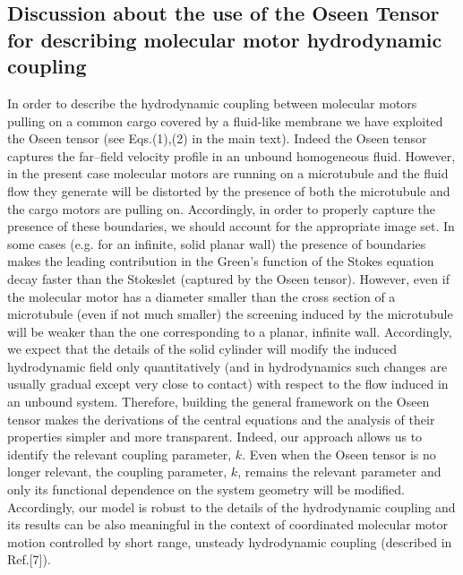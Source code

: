 \documentclass[prl,aps,twocolumn, floatfix, superscriptaddress,showpacs]{revtex4}
\begin{document}

\newpage
\begin{widetext}
\section{Discussion about the use of the Oseen Tensor for describing molecular motor hydrodynamic coupling}
In order to describe the hydrodynamic coupling between molecular motors pulling on a common cargo covered by a fluid-like membrane  we have exploited the Oseen tensor (see Eqs.(1),(2) in the main text). 
Indeed the Oseen tensor captures the far--field velocity profile in an unbound homogeneous fluid. However, in the present case molecular motors are running on a microtubule and the fluid flow they generate will be distorted by the presence of both the microtubule and the cargo motors are pulling on. 
Accordingly, in order to properly capture the presence of these boundaries, we should account for the appropriate image set. In some cases (e.g. for an infinite, solid planar wall) the presence of boundaries makes the leading contribution in the Green's function of the Stokes equation decay faster than the Stokeslet (captured by the Oseen tensor). However, even if the molecular motor has a diameter smaller than the cross section of a microtubule (even if not much smaller) the  screening induced by the microtubule will be weaker than the one corresponding to a planar, infinite wall. Accordingly, we expect that the details of the solid cylinder will modify the induced hydrodynamic field only quantitatively (and in hydrodynamics such changes are usually  gradual except very close to contact) with respect to the flow induced in an unbound system. 
Therefore, building the general framework on the Oseen tensor makes the derivations of the central equations and the analysis of their properties simpler and more transparent. 
Indeed, our approach allows us to identify the relevant coupling parameter, $k$. Even when the Oseen tensor is no longer relevant, the coupling parameter, $k$, remains the relevant parameter and only its functional dependence on the system geometry will be modified. Accordingly, our model is robust to the details of the hydrodynamic coupling and its results can be also meaningful in the context of coordinated molecular motor motion controlled by short range, unsteady  hydrodynamic coupling (described in Ref.[7]).


\end{widetext}
\end{document}
